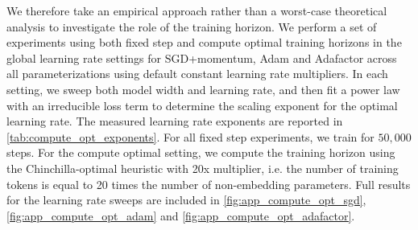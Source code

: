 We therefore take an empirical approach rather than a worst-case theoretical analysis to investigate the role of the training horizon. We perform a set of experiments using both fixed step and compute optimal training horizons in the global learning rate settings for SGD+momentum, Adam and Adafactor across all parameterizations using default constant learning rate multipliers. In each setting, we sweep both model width and learning rate, and then fit a power law with an irreducible loss term to determine the scaling exponent for the optimal learning rate. The measured learning rate exponents are reported in \cref{tab:compute_opt_exponents}. For all fixed step experiments, we train for $50{,}000$ steps. For the compute optimal setting, we compute the training horizon using the Chinchilla-optimal heuristic \citep{hoffmann2022training} with 20x multiplier, i.e. the number of training tokens is equal to 20 times the number of non-embedding parameters. Full results for the learning rate sweeps are included in \cref{fig:app_compute_opt_sgd}, \ref{fig:app_compute_opt_adam} and \ref{fig:app_compute_opt_adafactor}.

